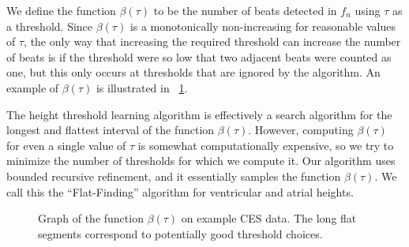 \documentclass[conference]{IEEEtran}
\begin{document}
We define the function $\beta(\tau)$ to be the number of beats detected in $f_n$ using $\tau$ as a threshold.
Since $\beta(\tau)$ is a monotonically non-increasing for reasonable values of $\tau$, 
the only way that increasing the required threshold can increase the number of beats is if the threshold were so low that two adjacent beats were counted as one, but this only occurs at thresholds that are ignored by the algorithm.
An example of $\beta(\tau)$ is illustrated in \figurename~\ref{fig:beats}.

The height threshold learning algorithm is effectively a search algorithm for the longest and flattest
interval of the function $\beta(\tau)$.
However, computing $\beta(\tau)$ for even a single value of $\tau$ 
is somewhat computationally expensive,
so we try to minimize the number of thresholds for which we compute it.
Our algorithm uses bounded recursive refinement, and it essentially samples the function $\beta(\tau)$.
We call this the ``Flat-Finding'' algorithm for
ventricular and atrial heights.


\begin{figure}
	\centering
	\caption{Graph of the function $\beta(\tau)$ on example CES data. The long flat segments correspond to potentially good threshold choices.}
	\label{fig:beats}
\end{figure}
\end{document}

